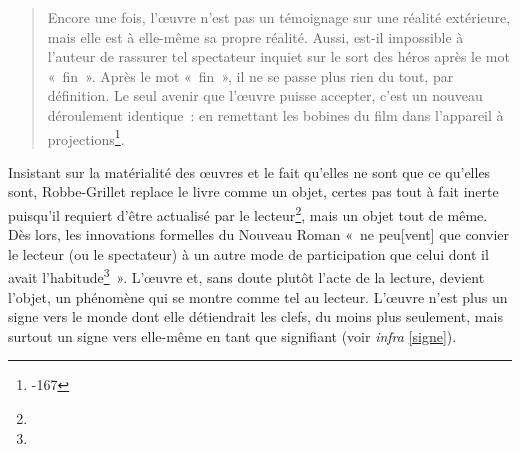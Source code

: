 \documentclass[12pt, a4paper]{article}
\begin{document}
\begin{quote}
    Encore une fois, l’œuvre n’est pas un témoignage sur une réalité extérieure, mais elle est à elle-même sa propre réalité. Aussi, est-il impossible à l’auteur de rassurer tel spectateur inquiet sur le sort des héros après le mot «~fin~». Après le mot «~fin~», il ne se passe plus rien du tout, par définition. Le seul avenir que l’œuvre puisse accepter, c’est un nouveau déroulement identique~: en remettant les bobines du film dans l’appareil à projections\footnote{-167}.
\end{quote}
Insistant sur la matérialité des œuvres et le fait qu'elles ne sont que ce qu'elles sont, Robbe-Grillet replace le livre comme un objet, certes pas tout à fait inerte puisqu'il requiert d'être actualisé par le lecteur\footnote{}, mais un objet tout de même. Dès lors, les innovations formelles du Nouveau Roman «~ne peu[vent] que convier le lecteur (ou le spectateur) à un autre mode de participation que celui dont il avait l’habitude\footnote{}~». L'œuvre et, sans doute plutôt l'acte de la lecture, devient l'objet, un phénomène qui se montre comme tel au lecteur. L'œuvre n'est plus un signe vers le monde dont elle détiendrait les clefs, du moins plus seulement, mais surtout un signe vers elle-même en tant que signifiant (voir \textit{infra} \ref{signe}). 
    


\end{document}
